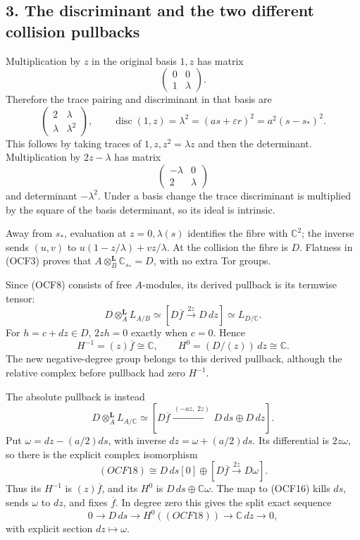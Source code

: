 \documentclass[
]{article}
\begin{document}
\subsection{3. The discriminant and the two different collision
pullbacks}\label{the-discriminant-and-the-two-different-collision-pullbacks}

Multiplication by \(z\) in the original basis \(1,z\) has matrix \[
\begin{pmatrix}0&0\\1&\lambda\end{pmatrix}.
\] Therefore the trace pairing and discriminant in that basis are \[
\begin{pmatrix}2&\lambda\\\lambda&\lambda^2\end{pmatrix},
\qquad
\operatorname{disc}(1,z)=\lambda^2
=(as+\varepsilon r)^2=a^2(s-s_*)^2.
\tag{OCF15}
\] This follows by taking traces of \(1,z,z^2=\lambda z\) and then the
determinant. Multiplication by \(2z-\lambda\) has matrix \[
\begin{pmatrix}-\lambda&0\\2&\lambda\end{pmatrix}
\] and determinant \(-\lambda^2\). Under a basis change the trace
discriminant is multiplied by the square of the basis determinant, so
its ideal is intrinsic.

Away from \(s_*\), evaluation at \(z=0,\lambda(s)\) identifies the fibre
with \(\mathbb C^2\); the inverse sends \((u,v)\) to
\(u(1-z/\lambda)+vz/\lambda\). At the collision the fibre is \(D\).
Flatness in (OCF3) proves that
\(A\otimes_B^{\mathbf L}\mathbb C_{s_*}=D\), with no extra Tor groups.

Since (OCF8) consists of free \(A\)-modules, its derived pullback is its
termwise tensor: \[
D\otimes_A^{\mathbf L}L_{A/B}
\simeq[D\overline f\xrightarrow{\,2z\,}D\,dz]
\simeq L_{D/\mathbb C}.
\tag{OCF16}
\] For \(h=c+dz\in D\), \(2zh=0\) exactly when \(c=0\). Hence \[
H^{-1}=(z)\overline f\cong\mathbb C,\qquad
H^0=(D/(z))\,dz\cong\mathbb C.
\tag{OCF17}
\] The new negative-degree group belongs to this derived pullback,
although the relative complex before pullback had zero \(H^{-1}\).

The absolute pullback is instead \[
D\otimes_A^{\mathbf L}L_{A/\mathbb C}
\simeq[D\overline f\xrightarrow{\,(-az,\;2z)\,}
 D\,ds\oplus D\,dz].
\tag{OCF18}
\] Put \(\omega=dz-(a/2)ds\), with inverse \(dz=\omega+(a/2)ds\). Its
differential is \(2z\omega\), so there is the explicit complex
isomorphism \[
(OCF18)\cong D\,ds[0]\oplus
[D\overline f\xrightarrow{\,2z\,}D\omega].
\tag{OCF19}
\] Thus its \(H^{-1}\) is \((z)\overline f\), and its \(H^0\) is
\(D\,ds\oplus\mathbb C\omega\). The map to (OCF16) kills \(ds\), sends
\(\omega\) to \(dz\), and fixes \(\overline f\). In degree zero this
gives the split exact sequence \[
0\to D\,ds\to H^0((OCF18))\to\mathbb C\,dz\to0,
\] with explicit section \(dz\mapsto\omega\).
\end{document}

